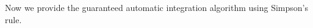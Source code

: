 \documentclass[draft]{iitthesis}
\theoremstyle{definition}
\theoremstyle{remark}
\begin{document}
%
%
%
Now we provide the guaranteed automatic integration algorithm using Simpson's rule.
\end{document}
